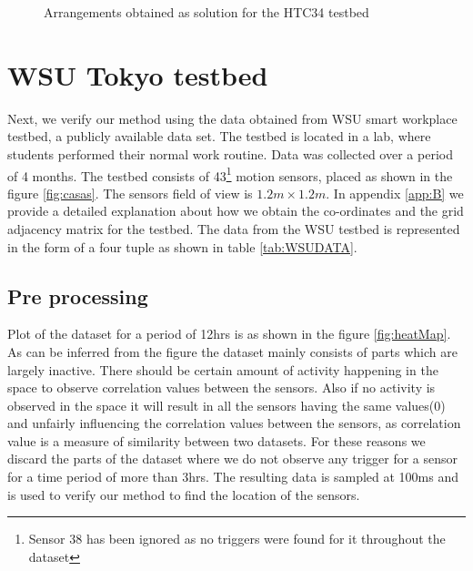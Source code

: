 \begin{figure}[!ht]
\caption{Arrangements obtained as solution for the HTC34 testbed}
\label{fig:arrangement4x2}
\centering
\end{figure}


\section{WSU Tokyo testbed}
Next, we verify our method using the data obtained from WSU smart workplace testbed\cite{cook2010detection}, a publicly available data set. The testbed is located in a lab,  where students performed their normal work routine. Data was collected over a period of 4 months. 
The testbed consists of 43\footnote{Sensor 38 has been ignored as no triggers were found for it throughout the dataset} motion sensors, placed as shown in the figure \ref{fig:casas}. The sensors field of view is $1.2m \times 1.2m$. In appendix \ref{app:B} we provide a detailed explanation about how we obtain the co-ordinates and the grid adjacency matrix for the testbed. The data from the WSU testbed is represented in the form of a four tuple as shown in table \ref{tab:WSUDATA}.
\subsection{Pre processing}
Plot of the dataset for a period of 12hrs is as shown in the figure \ref{fig:heatMap}. As can be inferred from the figure the dataset mainly consists of parts which are largely inactive. There should be certain amount of activity happening in the space to observe correlation values between the sensors.  Also if  no activity is observed in the space it will result in all the sensors having the same values(0) and unfairly influencing the correlation values between the sensors, as correlation value is a measure of similarity between two datasets. For these reasons we discard the parts of the dataset where we do not observe any trigger for a sensor for a time period of more than 3hrs. The resulting data is sampled at 100ms and is used to verify our method to find the location of the sensors.



